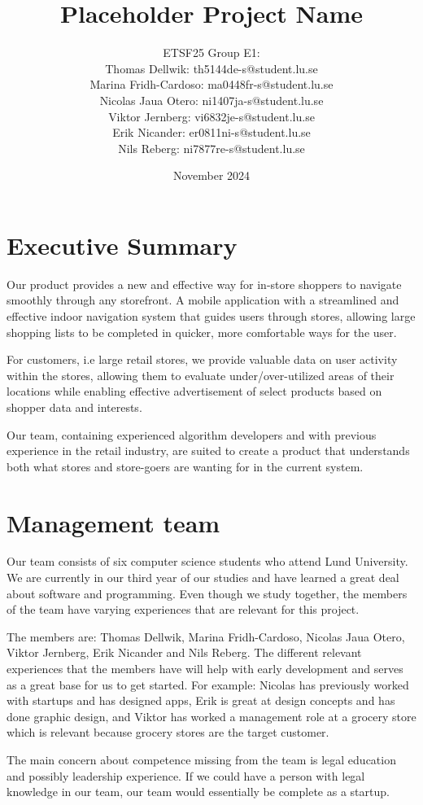 \documentclass[titlepage]{article}
\title{Placeholder Project Name}
\author{ETSF25 Group E1:\\Thomas Dellwik: th5144de-s@student.lu.se\\Marina Fridh-Cardoso: ma0448fr-s@student.lu.se\\Nicolas Jaua Otero: ni1407ja-s@student.lu.se\\Viktor Jernberg: vi6832je-s@student.lu.se\\Erik Nicander: er0811ni-s@student.lu.se\\Nils Reberg: ni7877re-s@student.lu.se\\
}
\date{November 2024}
\begin{document}
\maketitle

\section{Executive Summary}
Our product provides a new and effective way for in-store shoppers to navigate smoothly through any storefront. A mobile application with a streamlined and effective indoor navigation system that guides users through stores, allowing large shopping lists to be completed in quicker, more comfortable ways for the user. 

For customers, i.e large retail stores, we provide valuable data on user activity within the stores, allowing them to evaluate under/over-utilized areas of their locations while enabling effective advertisement of select products based on shopper data and interests. 

Our team, containing experienced algorithm developers and with previous experience in the retail industry, are suited to create a product that understands both what stores and store-goers are wanting for in the current system.

\section{Management team}
Our team consists of six computer science students who attend Lund University. We are currently in our third year of our studies and have learned a great deal about software and programming. Even though we study together, the members of the team have varying experiences that are relevant for this project.

The members are: Thomas Dellwik, Marina Fridh-Cardoso, Nicolas Jaua Otero, Viktor Jernberg, Erik Nicander and Nils Reberg. The different relevant experiences that the members have will help with early development and serves as a great base for us to get started. For example: Nicolas has previously worked with startups and has designed apps, Erik is great at design concepts and has done graphic design, and Viktor has worked a management role at a grocery store which is relevant because grocery stores are the target customer.

The main concern about competence missing from the team  is legal education and possibly leadership experience. If we could have a person with legal knowledge in our team, our team would essentially be complete as a startup.
\end{document}

